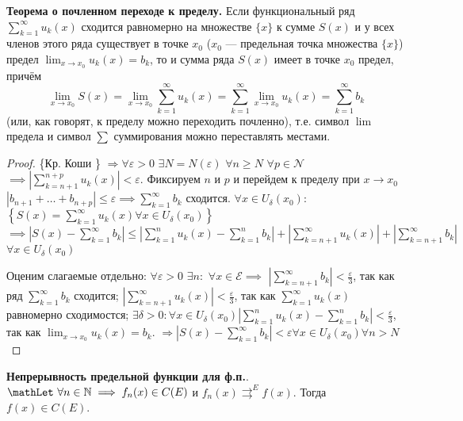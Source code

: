 \bigbreak 
\textbf{Теорема о почленном переходе к пределу.}
Если функциональный ряд $\displaystyle \sum_{k=1}^{\infty} u_k(x)$ сходится равномерно на множестве $\{x\}$ к сумме $S(x)$ и у всех членов этого ряда существует в точке $x_0$ ($x_0$ --- предельная точка множества $\{x\}$) предел $\displaystyle\lim_{x\to x_0} u_k(x) = b_k$, то и сумма ряда $S(x)$ имеет в точке $x_0$ предел, причём $$\displaystyle\lim_{x\to x_0} S(x) = \displaystyle\lim_{x\to x_0} \displaystyle\sum_{k=1}^{\infty} u_k(x) = \displaystyle\sum_{k=1}^{\infty} \displaystyle\lim_{x\to x_0} u_k(x) = \displaystyle\sum_{k=1}^{\infty} b_k$$
(или, как говорят, к пределу можно переходить почленно), т.е. символ $\lim$ предела и символ $\sum$ суммирования можно переставлять местами.

\begin{proof}
\{Кр. Коши \} $\Rightarrow \forall \varepsilon > 0$ $\exists N = N(\varepsilon)$ $\forall n \geq N$ $\forall p \in \mathcal{N}$ $\implies \left|\sum_{k=n+1}^{n+p}u_k(x)\right| < \varepsilon$. Фиксируем $n$ и $p$ и перейдем к пределу при $x \rightarrow x_0$ $|b_{n+1} + \dots + b_{n+p}| \leq \varepsilon \implies \sum_{k=1}^{\infty}b_k$ сходится.
$\forall x \in U_{\delta}(x_0): $
$\left\{S(x) = \sum_{k=1}^{\infty}u_k(x) \forall x \in U_{\delta}(x_0) \right\} $
$\implies \left|S(x) - \sum_{k=1}^{\infty}b_k\right| \leq \left|\sum_{k=1}^{n}u_k(x) - \sum_{k=1}^{n}b_k\right| + \left|\sum_{k=n+1}^{\infty}u_k(x)\right| + \left|\sum_{k=n+1}^{\infty}b_k\right|$ $ \forall x \in U_{\delta}(x_0)$

Оценим слагаемые отдельно:
$\forall \varepsilon > 0$ $\exists n:$ $\forall x \in \mathcal{E} \implies $
$\left|\sum_{k=n+1}^{\infty}b_k\right| < \frac{\varepsilon}{3}$, так как ряд $\sum_{k=1}^{\infty}b_k$ сходится;
$\left| \sum_{k=n+1}^{\infty}u_k(x) \right| < \frac{\varepsilon}{3}$, так как $\sum_{k=1}^{\infty}u_k(x)$ равномерно сходимостся;
$\exists \delta > 0: \forall x \in U_{\delta}(x_0) \left| \sum_{k=1}^{n}u_k(x) - \sum_{k=1}^{n}b_k \right| < \frac{\varepsilon}{3}$, так как $\lim_{x \rightarrow x_0}{u_k(x)} = b_k$.
$\Longrightarrow \left| S(x) - \sum_{k=1}^{\infty}b_k \right| < \varepsilon \forall x \in U_{\delta}(x_0) \forall n > N$
\end{proof}

\bigbreak 
\textbf{Непрерывность предельной функции для ф.п.}. 
$\mathLet ~ \forall n \in \mathbb{N} \implies f_n(x) \in C(E)$ и 
$f_n(x) \rightrightarrows^E f(x)$. Тогда $f(x) \in C(E)$.

